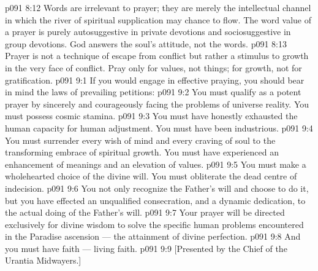 \vs p091 8:12 Words are irrelevant to prayer; they are merely the intellectual channel in which the river of spiritual supplication may chance to flow. The word value of a prayer is purely autosuggestive in private devotions and sociosuggestive in group devotions. God answers the soul’s attitude, not the words.
\vs p091 8:13 Prayer is not a technique of escape from conflict but rather a stimulus to growth in the very face of conflict. Pray only for values, not things; for growth, not for gratification.
\vs p091 9:1 If you would engage in effective praying, you should bear in mind the laws of prevailing petitions:
\vs p091 9:2 \bibnobreakspace You must qualify as a potent prayer by sincerely and courageously facing the problems of universe reality. You must possess cosmic stamina.
\vs p091 9:3 \bibnobreakspace You must have honestly exhausted the human capacity for human adjustment. You must have been industrious.
\vs p091 9:4 \bibnobreakspace You must surrender every wish of mind and every craving of soul to the transforming embrace of spiritual growth. You must have experienced an enhancement of meanings and an elevation of values.
\vs p091 9:5 \bibnobreakspace You must make a wholehearted choice of the divine will. You must obliterate the dead centre of indecision.
\vs p091 9:6 \bibnobreakspace You not only recognize the Father’s will and choose to do it, but you have effected an unqualified consecration, and a dynamic dedication, to the actual doing of the Father’s will.
\vs p091 9:7 \bibnobreakspace Your prayer will be directed exclusively for divine wisdom to solve the specific human problems encountered in the Paradise ascension --- the attainment of divine perfection.
\vs p091 9:8 \bibnobreakspace And you must have faith --- living faith.
\vsetoff
\vs p091 9:9 [Presented by the Chief of the Urantia Midwayers.]
\quizlink
